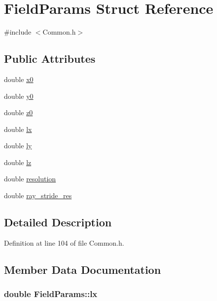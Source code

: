\hypertarget{struct_field_params}{}\section{Field\+Params Struct Reference}
\label{struct_field_params}


{\ttfamily \#include $<$Common.\+h$>$}

\subsection*{Public Attributes}
\begin{DoxyCompactItemize}
\item 
double \hyperlink{struct_field_params_ae702824fca4d3a4b4bbf4ac90084e3a7}{x0}
\item 
double \hyperlink{struct_field_params_ae9d400dadcfaaff44706adae06664c83}{y0}
\item 
double \hyperlink{struct_field_params_a51178f64cc93a37d6d8f774228c24a0f}{z0}
\item 
double \hyperlink{struct_field_params_a9738077907a76512e49cb284ee3f1949}{lx}
\item 
double \hyperlink{struct_field_params_afb39ded77b5714992e9b2f8c5d735d30}{ly}
\item 
double \hyperlink{struct_field_params_ae7532b58aed59f5b47233e57b67acc1a}{lz}
\item 
double \hyperlink{struct_field_params_a520406c76b3abf392401626bc2161370}{resolution}
\item 
double \hyperlink{struct_field_params_ae6eabaa6e593c9dbac48b2f96bea80ec}{ray\+\_\+stride\+\_\+res}
\end{DoxyCompactItemize}


\subsection{Detailed Description}


Definition at line 104 of file Common.\+h.



\subsection{Member Data Documentation}
\subsubsection[{\texorpdfstring{lx}{lx}}]{\setlength{\rightskip}{0pt plus 5cm}double Field\+Params\+::lx}\hypertarget{struct_field_params_a9738077907a76512e49cb284ee3f1949}{}\label{struct_field_params_a9738077907a76512e49cb284ee3f1949}


